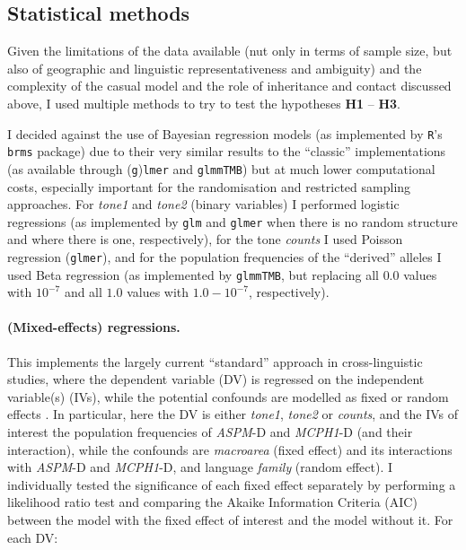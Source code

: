 \documentclass[twoside,onecolumn]{article}
\begin{document}
\subsection{Statistical methods}

Given the limitations of the data available (nut only in terms of sample size, but also of geographic and linguistic representativeness and ambiguity) and the complexity of the casual model and the role of inheritance and contact discussed above, I used multiple methods to try to test the hypotheses \textbf{H1} -- \textbf{H3}.

I decided against the use of Bayesian regression models (as implemented by \texttt{R}'s \texttt{brms} package) due to their very similar results to the ``classic'' implementations (as available through (\texttt{g})\texttt{lmer} and \texttt{glmmTMB}) but at much lower computational costs, especially important for the randomisation and restricted sampling approaches.
For \textit{tone1} and \textit{tone2} (binary variables) I performed logistic regressions (as implemented by \texttt{glm} and \texttt{glmer} when there is no random structure and where there is one, respectively), for the tone \textit{counts} I used Poisson regression (\texttt{glmer}), and for the population frequencies of the ``derived'' alleles I used Beta regression (as implemented by \texttt{glmmTMB}, but replacing all $0.0$ values with $10^{-7}$ and all $1.0$ values with $1.0 - 10^{-7}$, respectively).

\paragraph{(Mixed-effects) regressions.}

This implements the largely current ``standard'' approach in cross-linguistic studies, where the dependent variable (DV) is regressed on the independent variable(s) (IVs), while the potential confounds are modelled as fixed or random effects \citep{ladd_correlational_2015,jaeger_mixed_2011}.
In particular, here the DV is either \textit{tone1}, \textit{tone2} or \textit{counts}, and the IVs of interest the population frequencies of \textit{ASPM}-D and \textit{MCPH1}-D (and their interaction), while the confounds are \textit{macroarea} (fixed effect) and its interactions with \textit{ASPM}-D and \textit{MCPH1}-D, and language \textit{family} (random effect).
I individually tested the significance of each fixed effect separately by performing a likelihood ratio test and comparing the Akaike Information Criteria (AIC) between the model with the fixed effect of interest and the model without it.
For each DV:
\end{document}
